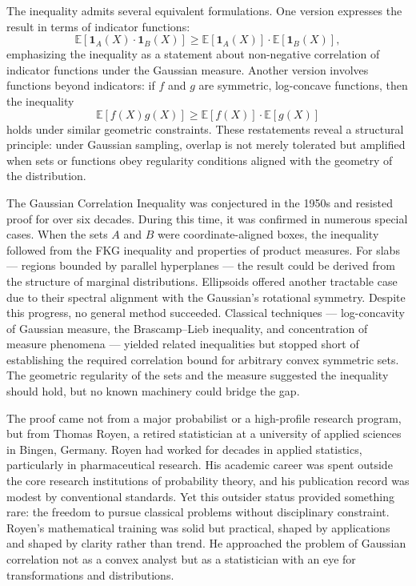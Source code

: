 The inequality admits several equivalent formulations. One version expresses the result in terms of indicator functions:
\[
\mathbb{E}[\mathbf{1}_A(X) \cdot \mathbf{1}_B(X)] \geq \mathbb{E}[\mathbf{1}_A(X)] \cdot \mathbb{E}[\mathbf{1}_B(X)],
\]
emphasizing the inequality as a statement about non-negative correlation of indicator functions under the Gaussian measure. Another version involves functions beyond indicators: if \( f \) and \( g \) are symmetric, log-concave functions, then the inequality
\[
\mathbb{E}[f(X)g(X)] \geq \mathbb{E}[f(X)] \cdot \mathbb{E}[g(X)]
\]
holds under similar geometric constraints. These restatements reveal a structural principle: under Gaussian sampling, overlap is not merely tolerated but amplified when sets or functions obey regularity conditions aligned with the geometry of the distribution.

The Gaussian Correlation Inequality was conjectured in the 1950s and resisted proof for over six decades. During this time, it was confirmed in numerous special cases. When the sets \( A \) and \( B \) were coordinate-aligned boxes, the inequality followed from the FKG inequality and properties of product measures. For slabs — regions bounded by parallel hyperplanes — the result could be derived from the structure of marginal distributions. Ellipsoids offered another tractable case due to their spectral alignment with the Gaussian’s rotational symmetry. Despite this progress, no general method succeeded. Classical techniques — log-concavity of Gaussian measure, the Brascamp–Lieb inequality, and concentration of measure phenomena — yielded related inequalities but stopped short of establishing the required correlation bound for arbitrary convex symmetric sets. The geometric regularity of the sets and the measure suggested the inequality should hold, but no known machinery could bridge the gap.

The proof came not from a major probabilist or a high-profile research program, but from Thomas Royen, a retired statistician at a university of applied sciences in Bingen, Germany. Royen had worked for decades in applied statistics, particularly in pharmaceutical research. His academic career was spent outside the core research institutions of probability theory, and his publication record was modest by conventional standards. Yet this outsider status provided something rare: the freedom to pursue classical problems without disciplinary constraint. Royen’s mathematical training was solid but practical, shaped by applications and shaped by clarity rather than trend. He approached the problem of Gaussian correlation not as a convex analyst but as a statistician with an eye for transformations and distributions.

